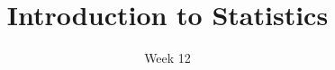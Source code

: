 \title{Introduction to Statistics}
\date{Week 12}





\thispagestyle{plain}

\graphicspath{{lectures/sentiment/}}




